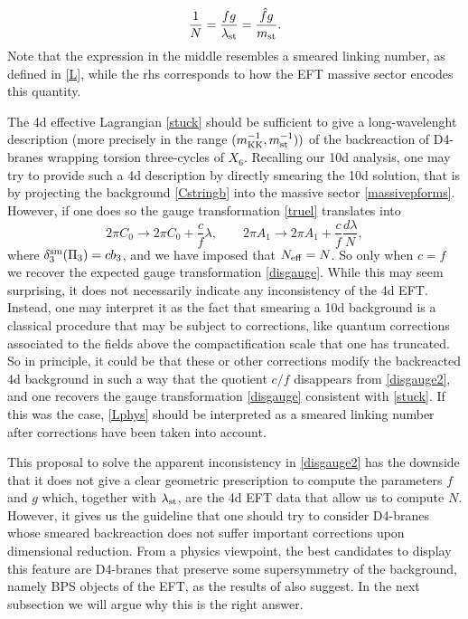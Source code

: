 \documentclass[11pt]{article}
\def\be{\begin{equation}}
\def\ee{\end{equation}}
\begin{document}
\be
\frac{1}{N} = \frac{fg}{\lambda_{\rm st}} = \frac{\hat{f}g}{m_{\rm st}} .
\label{Lphys}
\ee
Note that the expression in the middle resembles a smeared linking number, as defined in \eqref{L}, while the rhs corresponds to how the  EFT massive sector encodes this quantity.


The 4d effective Lagrangian \eqref{stuck} should be sufficient to give a long-wavelenght description (more precisely in the range $(m_{\rm KK}^{-1}, m_{\rm st}^{-1}))$ of the backreaction of D4-branes wrapping torsion three-cycles of $X_6$. Recalling our 10d analysis, one may try to provide such a 4d description by directly smearing the 10d solution, that is by projecting the background \eqref{Cstringb} into the massive sector \eqref{massivepforms}. However, if one does so the gauge transformation \eqref{truel} translates into
\be
2\pi C_0 \to 2\pi C_0 + \frac{c}{f} \lambda , \qquad 2\pi A_1 \to  2\pi A_1 + \frac{c}{f}  \frac{d\lambda}{N} ,
\label{disgauge2}
\ee
where $\delta_3^{\rm sm}(\Pi_3) = c b_3$, and we have imposed that $N_{\rm eff} = N$. So only when $c=f$ we recover the expected gauge transformation \eqref{disgauge}. While this may seem surprising, it does not necessarily indicate any inconsistency of the 4d EFT. Instead, one may interpret it as the fact that smearing a 10d background is a classical procedure that may be subject to corrections, like quantum corrections associated to the fields above the compactification scale that one has truncated.   So in principle, it could be that these or other corrections modify the backreacted 4d background in such a way that the quotient $c/f$ disappears from \eqref{disgauge2}, and one recovers the gauge transformation \eqref{disgauge} consistent with \eqref{stuck}. If this was the case, \eqref{Lphys} should be interpreted as a smeared linking number after corrections have been taken into account. 

This proposal to solve the apparent inconsistency in \eqref{disgauge2} has the downside that it does not give a clear geometric prescription to compute the parameters $f$ and $g$ which, together with $\lambda_{\rm st}$, are the 4d EFT data that allow us to compute $N$. However, it gives us the guideline that one should try to consider D4-branes whose smeared backreaction does not suffer important corrections upon dimensional reduction. From a physics viewpoint, the best candidates to display this feature are D4-branes that preserve some supersymmetry of the background, namely BPS objects of the EFT, as the results of \cite{Blaback:2010sj} also suggest. In the next subsection we will argue why this is the right answer. 
\end{document}
